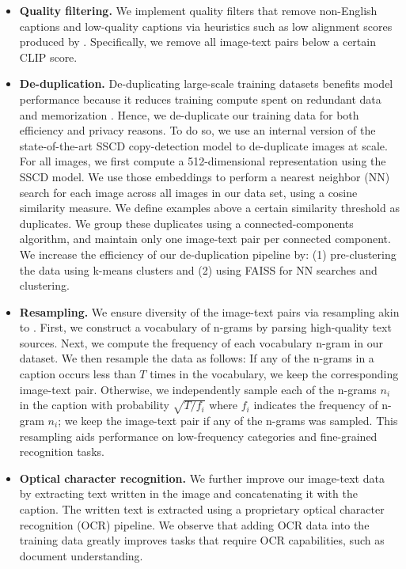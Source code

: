 \begin{itemize}

\item \textbf{Quality filtering.} We implement quality filters that remove non-English captions and low-quality captions via heuristics such as low alignment scores produced by \citep{radford2021learning}.
Specifically, we remove all image-text pairs below a certain CLIP score.

\item \textbf{De-duplication.} De-duplicating large-scale training datasets benefits model performance because it reduces training compute spent on redundant data \citep{esser2024scaling,lee2021deduplicating,abbas2023semdedup} and memorization \citep{carlini2023extracting,somepalli2023diffusion}.
Hence, we de-duplicate our training data for both efficiency and privacy reasons.
To do so, we use an internal version of the state-of-the-art SSCD copy-detection model \citep{pizzi2022self} to de-duplicate images at scale.
For all images, we first compute a 512-dimensional representation using the SSCD model.
We use those embeddings to perform a nearest neighbor (NN) search for each image across all images in our data set, using a cosine similarity measure.
We define examples above a certain similarity threshold as duplicates.
We group these duplicates using a connected-components algorithm, and maintain only one image-text pair per connected component.
We increase the efficiency of our de-duplication pipeline by: (1) pre-clustering the data using k-means clusters and (2) using FAISS \citep{johnson2019billion} for NN searches and clustering.

\item \textbf{Resampling.} We ensure diversity of the image-text pairs via resampling akin to \citet{xu2023demystifying,Mahajan_2018_ECCV,mikolov2013efficient}.
First, we construct a vocabulary of n-grams by parsing high-quality text sources.
Next, we compute the frequency of each vocabulary n-gram in our dataset.
We then resample the data as follows:
If any of the n-grams in a caption occurs less than $T$ times in the vocabulary, we keep the corresponding image-text pair.
Otherwise, we independently sample each of the n-grams $n_i$ in the caption with probability $\sqrt{T / f_i}$ where $f_i$ indicates the frequency of n-gram $n_i$; we keep the image-text pair if any of the n-grams was sampled.
This resampling aids performance on low-frequency categories and fine-grained recognition tasks.

\item \textbf{Optical character recognition.} We further improve our image-text data by extracting text written in the image and concatenating it with the caption.
The written text is extracted using a proprietary optical character recognition (OCR) pipeline.
We observe that adding OCR data into the training data greatly improves tasks that require OCR capabilities, such as document understanding.

\end{itemize}

